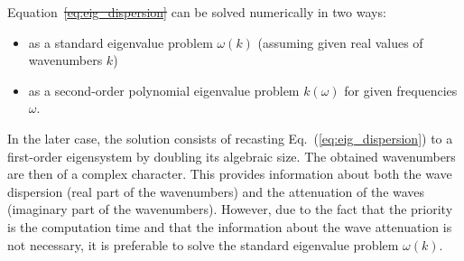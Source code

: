 \documentclass[preprint,12pt]{elsarticle}
\providecommand{\DIFaddtex}[1]{{\protect\color{blue}\uwave{#1}}} %
\providecommand{\DIFdeltex}[1]{{\protect\color{red}\sout{#1}}}                      %
\providecommand{\DIFaddbegin}{} %
\providecommand{\DIFaddend}{} %
\providecommand{\DIFdelbegin}{} %
\providecommand{\DIFdelend}{} %
\providecommand{\DIFadd}[1]{\texorpdfstring{\DIFaddtex{#1}}{#1}} %
\providecommand{\DIFdel}[1]{\texorpdfstring{\DIFdeltex{#1}}{}} %
\begin{document}
	Equation~\DIFdelbegin \DIFdel{\ref{eq:eig_dispersion} }\DIFdelend \DIFaddbegin \DIFadd{(\ref{eq:eig_dispersion}) }\DIFaddend can be solved numerically in two ways:
	\begin{itemize}
		\item as a standard eigenvalue problem $\omega (k)$ (assuming given real values of wavenumbers $k$)
		\item as a second-order polynomial eigenvalue problem $k(\omega)$ for given frequencies $\omega$.
	\end{itemize}
In the later case, the solution consists of recasting Eq.~(\ref{eq:eig_dispersion}) to a first-order eigensystem by doubling its algebraic size.  The obtained wavenumbers are then of a complex character. This provides information about both the wave dispersion (real part of the wavenumbers) and the attenuation of the waves (imaginary part of the wavenumbers).  However, due to the fact that the priority is the computation time and that the information about the wave attenuation is not necessary, it is preferable to solve the standard eigenvalue problem $\omega (k)$.
\end{document}
